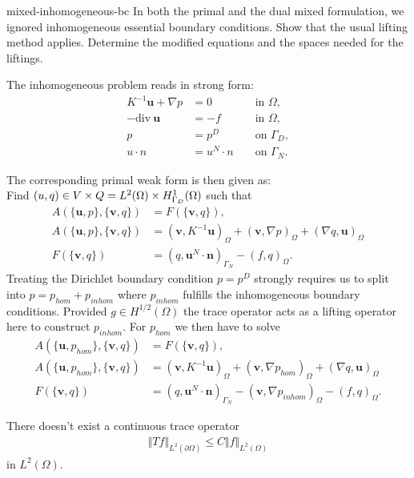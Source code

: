 \begin{Problem}{mixed-inhomogeneous-bc}
  In both the primal and the dual mixed formulation, we ignored
  inhomogeneous essential boundary conditions. Show that the usual
  lifting method applies. Determine the modified equations and the
  spaces needed for the liftings.
\begin{solution}
The inhomogeneous problem reads in strong form:\\
\begin{align}
K^{-1} {\mathbf u} + \nabla p &= 0 && \textrm{ in } \Omega,\\
-{\textrm{div}}\ {\mathbf u} &= -f && \textrm{ in } \Omega,\\
p &= p^D && \textrm{ on } \Gamma_D, \\
u\cdot n &=  u^N \cdot n && \textrm{ on } \Gamma_N.
\end{align}

The corresponding primal weak form is then given as: \\
Find $(u,q)\in V\times Q=L^2(\Omega)\times H_{\Gamma_D}^1(\Omega)$ such that
\begin{align}
A(\{{\mathbf u},p\},\{{\mathbf v},q\}) &= F(\{{\mathbf v},q\}), \\
A(\{{\mathbf u},p\},\{{\mathbf v},q\}) &= ({\mathbf v}, K^{-1}{\mathbf u})_\Omega +({\mathbf v}, \nabla p)_\Omega + (\nabla q,{\mathbf u})_\Omega \\
F(\{{\mathbf v},q\}) &= (q, {\mathbf u}^N\cdot {\mathbf n})_{\Gamma_N} - (f,q)_\Omega.
\end{align}
Treating the Dirichlet boundary condition $p = p^D$ strongly requires us to
split into $p=p_{hom} + p_{inhom}$ where $p_{inhom}$ fulfills the inhomogeneous
boundary conditions. Provided $g\in H^{1/2}(\Omega)$ the trace operator acts
as a lifting operator here to construct $p_{inhom}$.
For $p_{hom}$ we then have to solve
\begin{align}
A(\{{\mathbf u},p_{hom}\},\{{\mathbf v},q\}) &= F(\{{\mathbf v},q\}), \\
A(\{{\mathbf u},p_{hom}\},\{{\mathbf v},q\})
  &= ({\mathbf v}, K^{-1}{\mathbf u})_\Omega +({\mathbf v}, \nabla p_{hom})_\Omega
     + (\nabla q,{\mathbf u})_\Omega \\
F(\{{\mathbf v},q\})
  &= (q, {\mathbf u}^N\cdot {\mathbf n})_{\Gamma_N}-
     ({\mathbf v}, \nabla p_{inhom})_\Omega - (f,q)_\Omega.
\end{align}

There doesn't exist a continuous trace operator
\begin{align}
 \Vert T f \Vert_{L^2(\partial \Omega)}\le C \Vert f \Vert_{L^2(\Omega)}
\end{align}
in $L^2(\Omega)$.



\end{solution}
\end{Problem}
